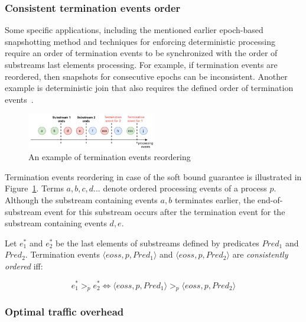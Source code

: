 \subsubsection{Consistent termination events order}
Some specific applications, including the mentioned earlier epoch-based snapshotting method and techniques for enforcing deterministic processing~\cite{we2018adbis} require an order of termination events to be synchronized with the order of substreams last elements processing. For example, if termination events are reordered, then snapshots for consecutive epochs can be inconsistent. Another example is deterministic join that also requires the defined order of termination events~\cite{gulisano2016scalejoin}.

\begin{figure}[htbp]
  \centering
  \includegraphics[width=0.50\textwidth]{pics/notifications-reordering.pdf}
  \caption{An example of termination events reordering}
  \label{notifications_reordering}
\end{figure}

Termination events reordering in case of the soft bound guarantee is illustrated in Figure~\ref{notifications_reordering}. Terms $a,b,c,d...$ denote ordered processing events of a process $p$. Although the substream containing events $a,b$ terminates earlier, the end-of-substream event for this substream occurs after the termination event for the substream containing events $d,e$. 

\begin{definition}
Let $e^{*}_1$ and $e^{*}_2$ be the last elements of substreams defined by predicates $Pred_1$ and $Pred_2$. Termination events $\langle eoss, p, Pred_1\rangle$ and $\langle eoss, p, Pred_2\rangle$ are {\em consistently ordered} iff:

\begin{equation}
e^{*}_1 >_p e^{*}_2 \Leftrightarrow \langle eoss, p, Pred_1\rangle >_p \langle eoss, p, Pred_2\rangle
\end{equation}
\end{definition}

\subsubsection{Optimal traffic overhead}

